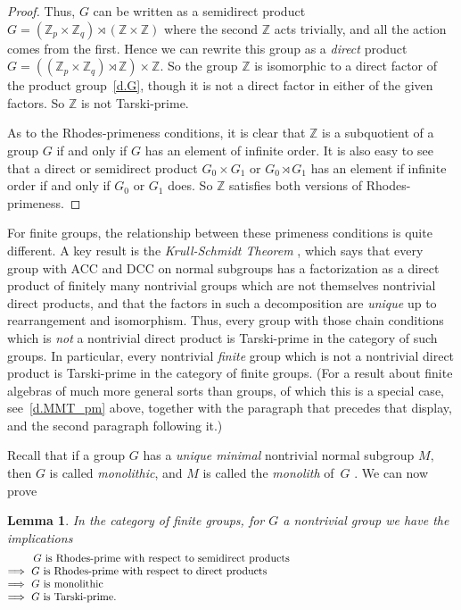 \documentclass{amsart}
\newtheorem{lemma}[theorem]{Lemma}
\numberwithin{equation}{section}
\numberwithin{theorem}{section}
\newcommand{\Z}{\mathbb{Z}}
\begin{document}
\begin{proof}
Thus, $G$ can be written as a semidirect product
$G=(\Z_p\times\Z_q)\rtimes(\Z\times\Z)$ where the second
$\Z$ acts trivially,
and all the action comes from the first.
Hence we can rewrite this group as a {\em direct} product
$G=((\Z_p\times \Z_q)\rtimes\Z)\times\Z.$
So the group $\Z$ is isomorphic to a direct factor of the
product group~\eqref{d.G}, though it is
not a direct factor in either of the given factors.
So $\Z$ is not Tarski-prime.

As to the Rhodes-primeness conditions, it is clear
that $\Z$ is a subquotient
of a group $G$ if and only if $G$ has an element of infinite order.
It is also easy to see that a direct or semidirect
product $G_0\times G_1$ or $G_0\rtimes G_1$ has an element
if infinite order if and only if $G_0$ or $G_1$ does.
So $\Z$ satisfies both versions of Rhodes-primeness.
\end{proof}

For finite groups, the relationship between these
primeness conditions is quite different.
A key result is the {\em Krull-Schmidt Theorem}
\cite[Theorem~3.8, p.\,86]{TWH}, which says that every
group with ACC and DCC on normal subgroups has a factorization
as a direct product of finitely many nontrivial groups which are not
themselves nontrivial direct products, and that the factors in such
a decomposition are {\em unique} up to rearrangement and isomorphism.
Thus, every group with those chain conditions which is {\em not} a
nontrivial direct product is
Tarski-prime in the category of such groups.
In particular, every nontrivial {\em finite} group which is not
a nontrivial direct product is Tarski-prime in the
category of finite groups.
(For a result about finite algebras of
much more general sorts than groups, of which this is a special case,
see~\eqref{d.MMT_pm} above,
together with the paragraph that precedes that display,
and the second paragraph following it.)

Recall that if a group $G$ has a {\em unique minimal}
nontrivial normal subgroup $M,$ then $G$ is called
{\em monolithic}, and $M$ is called the {\em monolith} of~$G$
\cite[sentence beginning at bottom of p.\,146]{HN}.
We can now prove

\begin{lemma}\label{L.=>=>}
In the category of {\em finite groups,} for $G$ a nontrivial group
we have the implications
%
\begin{equation}\begin{minipage}[c]{35pc}\label{d.=>=>}
\hspace{2.4em}$G$ is Rhodes-prime with respect to semidirect products\\
$\implies$ $G$ is Rhodes-prime with respect to direct products\\
$\implies$ $G$ is monolithic\\
$\implies$ $G$ is Tarski-prime.
\end{minipage}\end{equation}
%
\end{lemma}
\end{document}
